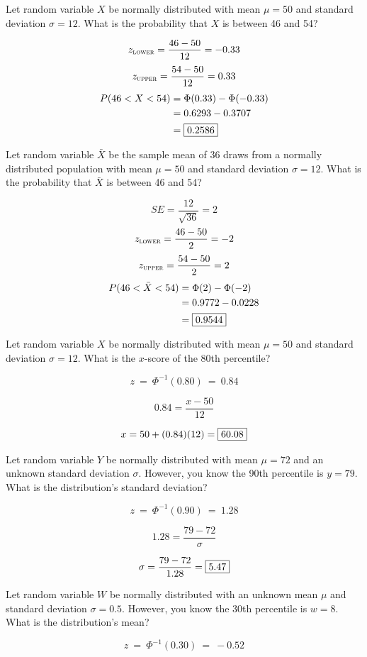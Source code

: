 \documentclass[12pt,letterpaper,addpoints]{exam}
\begin{document}
\begin{questions}
\question[10] Let random variable $X$ be normally distributed with mean $\mu=50$ and standard deviation $\sigma=12$. What is the probability that $X$ is between 46 and 54?
\begin{solution}
$$z_\textsc{lower} = \frac{46-50}{12} = -0.33$$
$$z_\textsc{upper} = \frac{54-50}{12} = 0.33$$
\begin{align*}
P(46<X<54) &= \Phi(0.33)-\Phi(-0.33) \\
&= 0.6293 - 0.3707 \\
&= \fbox{0.2586}
\end{align*}
\end{solution}
\vfill
\question[10] Let random variable $\bar{X}$ be the sample mean of 36 draws from a normally distributed population with mean $\mu=50$ and standard deviation $\sigma=12$. What is the probability that $\bar{X}$ is between 46 and 54?
\begin{solution}
$$SE = \frac{12}{\sqrt{36}} = 2 $$
$$z_\textsc{lower} = \frac{46-50}{2} = -2$$
$$z_\textsc{upper} = \frac{54-50}{2} = 2$$
\begin{align*}
P(46<\bar{X}<54) &= \Phi(2)-\Phi(-2) \\
&= 0.9772 - 0.0228 \\
&= \fbox{0.9544}
\end{align*}
\end{solution}
\vfill
\newpage

\question[10] Let random variable $X$ be normally distributed with mean $\mu=50$ and standard deviation $\sigma=12$. What is the $x$-score of the 80th percentile?
\begin{solution}
$$z ~=~ \Phi^{-1}(0.80) ~=~ 0.84 $$

$$0.84 = \frac{x-50}{12}$$

$$x = 50+(0.84)(12) = \fbox{60.08}$$
\end{solution}
\vfill

\question[10] Let random variable $Y$ be normally distributed with mean $\mu=72$ and an unknown standard deviation $\sigma$. However, you know the 90th percentile is $y=79$. What is the distribution's standard deviation?
\begin{solution}
$$z ~=~ \Phi^{-1}(0.90) ~=~ 1.28 $$

$$1.28 = \frac{79-72}{\sigma}$$

$$\sigma = \frac{79-72}{1.28} = \fbox{5.47}$$
\end{solution}
\vfill

\question[10] Let random variable $W$ be normally distributed with an unknown mean $\mu$ and standard deviation $\sigma=0.5$. However, you know the 30th percentile is $w=8$. What is the distribution's mean?
\begin{solution}
$$z ~=~ \Phi^{-1}(0.30) ~=~ -0.52 $$


\end{solution}
\end{questions}
\end{document}
